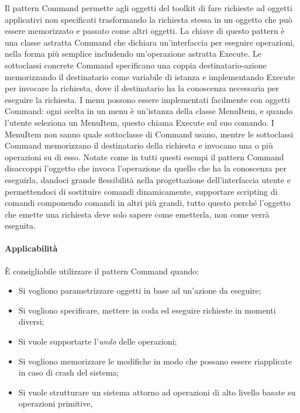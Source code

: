 \begin{multicols}{2}
\begin{figure}[H]
    \end{figure}
\end{multicols}

Il pattern Command permette agli oggetti del toolkit di fare richieste ad oggetti applicativi non specificati trasformando la richiesta stessa in un oggetto che può essere memorizzato e passato come altri oggetti. La chiave di questo pattern è una classe astratta Command che dichiara un'interfaccia per eseguire operazioni, nella forma più semplice includendo un'operazione astratta Execute. Le sottoclassi concrete Command specificano una coppia destinatario-azione memorizzando il destinatario come variabile di istanza e implementando Execute per invocare la richiesta, dove il destinatario ha la conoscenza necessaria per eseguire la richiesta. I menu possono essere implementati facilmente con oggetti Command: ogni scelta in un menu è un'istanza della classe MenuItem, e quando l'utente seleziona un MenuItem, questo chiama Execute sul suo comando. I MenuItem non sanno quale sottoclasse di Command usano, mentre le sottoclassi Command memorizzano il destinatario della richiesta e invocano una o più operazioni su di esso. Notate come in tutti questi esempi il pattern Command disaccoppi l'oggetto che invoca l'operazione da quello che ha la conoscenza per eseguirla, dandoci grande flessibilità nella progettazione dell'interfaccia utente e permettendoci di sostituire comandi dinamicamente, supportare scripting di comandi componendo comandi in altri più grandi, tutto questo perché l'oggetto che emette una richiesta deve solo sapere come emetterla, non come verrà eseguita.

\paragraph{Applicabilità} È consigliabile utilizzare il pattern Command quando:
\begin{itemize}
    \item Si vogliono parametrizzare oggetti in base ad un'azione da eseguire;
    \item Si vogliono specificare, mettere in coda ed eseguire richieste in momenti diversi;
    \item Si vuole supportarte l'\textit{undo} delle operazioni;
    \item Si vogliono memorizzare le modifiche in modo che possano essere riapplicate in caso di crash del sistema;
    \item Si vuole strutturare un sistema attorno ad operazioni di alto livello basate su operazioni primitive,
\end{itemize}

